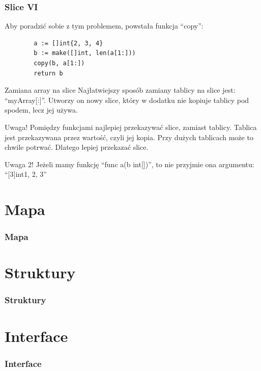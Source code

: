 \documentclass[10pt]{beamer}
\newcommand{\quotes}[1]{``#1''}
\begin{document}
\begin{frame}[fragile]
    \frametitle{Slice VI}
    Aby poradzić sobie z tym problemem, powstała funkcja \quotes{copy}:
    \begin{verbatim}
        a := []int{2, 3, 4}
        b := make([]int, len(a[1:]))
        copy(b, a[1:])
        return b
    \end{verbatim}

    \begin{block}{Zamiana array na slice}
        Najłatwiejszy sposób zamiany tablicy na slice jest: \quotes{myArray[:]}.
        Utworzy on nowy slice, który w dodatku nie kopiuje tablicy pod spodem, lecz
        jej używa.
    \end{block}

    \begin{alertblock}{Uwaga!}
        Pomiędzy funkcjami najlepiej przekazywać slice, zamiast tablicy. Tablica
        jest przekazywana przez wartość, czyli jej kopia. Przy dużych tablicach
        może to chwile potrwać. Dlatego lepiej przekazać slice. 
    \end{alertblock}

    \begin{alertblock}{Uwaga 2!}
        Jeżeli mamy funkcję \quotes{func a(b int[])}, to nie przyjmie ona argumentu:
        \quotes{[3]int{1, 2, 3}}
    \end{alertblock}
\end{frame}

\section[Mapa]{Mapa}
\begin{frame}[fragile]
    \frametitle{Mapa}
\end{frame}

\section[Struktury]{Struktury}
\begin{frame}[fragile]
    \frametitle{Struktury}
\end{frame}


\section[Interface]{Interface}
\begin{frame}[fragile]
    \frametitle{Interface}
\end{frame}


\end{document}

